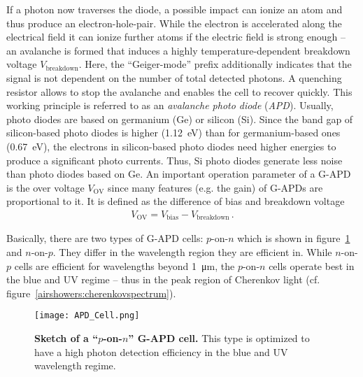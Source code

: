 If a photon now traverses the diode, a possible impact can ionize an atom and thus produce an electron-hole-pair. While the electron is accelerated along the electrical field it can ionize further atoms if the electric field is strong enough -- an avalanche is formed that induces a highly temperature-dependent breakdown voltage $V_\text{breakdown}$. Here, the \enquote{Geiger-mode} prefix additionally indicates that the signal is not dependent on the number of total detected photons. A quenching resistor allows to stop the avalanche and enables the cell to recover quickly. This working principle is referred to as an \textit{avalanche photo diode} (\textit{APD}). Usually, photo diodes are based on germanium (Ge) or silicon (Si). Since the band gap of silicon-based photo diodes is higher (\SI{1.12}{\electronvolt}) than for germanium-based ones (\SI{0.67}{\electronvolt}), the electrons in silicon-based photo diodes need higher energies to produce a significant photo currents. Thus, Si photo diodes generate less noise than photo diodes based on Ge. \cite{sipm:renker_lorenz} An important operation parameter of a G-APD is the over voltage $V_\text{OV}$ since many features (e.g. the gain) of G-APDs are proportional to it. It is defined as the difference of bias and breakdown voltage~\cite{sipm:renker_lorenz}
\begin{align}
	V_\text{OV} = V_\text{bias} - V_\text{breakdown}\,.
\end{align}

Basically, there are two types of G-APD cells: $p$-on-$n$ which is shown in figure~\ref{sipm:apd_cell} and $n$-on-$p$. They differ in the wavelength region they are efficient in. While $n$-on-$p$ cells are efficient for wavelengths beyond \SI{1}{\micro\meter}, the $p$-on-$n$ cells operate best in the blue and UV regime -- thus in the peak region of Cherenkov light (cf. figure~\ref{airshowers:cherenkovspectrum}).

\begin{figure}[H]
	\centering
	\texttt{[image: APD\_Cell.png]}
	\caption[Sketch of a \enquote{$p$-on-$n$} G-APD cell]{\textbf{Sketch of a \enquote{$p$-on-$n$} G-APD cell.} \cite{sipm:renker_lorenz} This type is optimized to have a high photon detection efficiency in the blue and UV wavelength regime.}
	\label{sipm:apd_cell}	
\end{figure}

